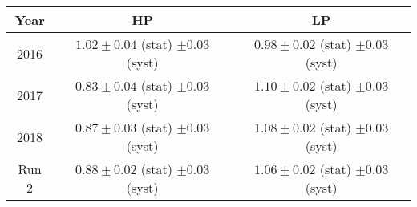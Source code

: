\footnotesize
\begin{tabular}{c|c|c}
  \hline
  Year & HP & LP \\
  \hline
  \hline
  2016  & $1.02 \pm 0.04$ (stat) $\pm 0.03$ (syst) & $0.98 \pm 0.02$ (stat) $\pm 0.03$ (syst)  \\
  2017  & $0.83 \pm 0.04$ (stat) $\pm 0.03$ (syst) & $1.10 \pm 0.02$ (stat) $\pm 0.03$ (syst)  \\
  2018  & $0.87 \pm 0.03$ (stat) $\pm 0.03$ (syst) & $1.08 \pm 0.02$ (stat) $\pm 0.03$ (syst)  \\
  Run 2 & $0.88 \pm 0.02$ (stat) $\pm 0.03$ (syst) & $1.06 \pm 0.02$ (stat) $\pm 0.03$ (syst)  \\
  \hline
\end{tabular}
